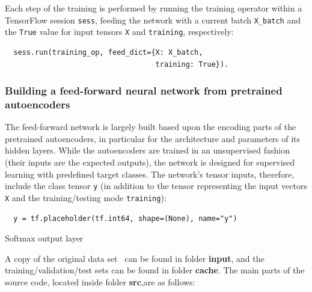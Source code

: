 \documentclass[12pt]{article}
\begin{document}
Each step of the training is performed by running the training operator within a TensorFlow session \texttt{sess}, feeding the network with a current batch \texttt{X\_batch} and the \texttt{True} value for input tensors \texttt{X} and \texttt{training}, respectively:
\begin{verbatim}
  sess.run(training_op, feed_dict={X: X_batch, 
                                   training: True}).
\end{verbatim}

\subsubsection{Building a feed-forward neural network from pretrained autoencoders}

\noindent
The feed-forward network is largely built based upon the encoding parts of the pretrained autoencoders, in particular for the architecture and parameters of its hidden layers. While the autoencoders are trained in an unsupervised fashion (their inputs are the expected outputs), the network is designed for supervised learning with predefined target classes. The network's tensor inputs, therefore, include the class tensor \texttt{y} (in addition to the tensor representing the input vectors \texttt{X} and the training/testing mode \texttt{training}):
\begin{verbatim}
  y = tf.placeholder(tf.int64, shape=(None), name="y")
\end{verbatim}

Softmax output layer





A copy of the original data set~\cite{andrzejak2001indications} can be found in folder \textbf{input}, and the training/validation/test sets can be found in folder \textbf{cache}. The main parts of the source code, located inside folder \textbf{src},are as follows:
\end{document}
